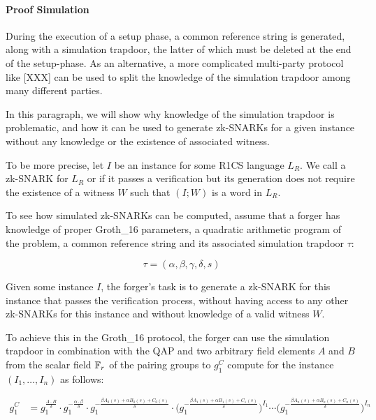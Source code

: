 \paragraph{Proof Simulation} During the execution of a setup phase, a common reference string is generated, along with a simulation trapdoor, the latter of which must be deleted at the end of the setup-phase. As an alternative, a more complicated multi-party protocol like [XXX] can be used to split the knowledge of the simulation trapdoor among many different parties.

In this paragraph, we will show why knowledge of the simulation trapdoor is problematic, and how it can be used to generate zk-SNARKs for a given instance without any knowledge or the existence of associated witness. 

To be more precise, let $I$ be an instance for some R1CS language $L_R$. We call a zk-SNARK for $L_R$  or  if it passes a verification but its generation does not require the existence of a witness $W$ such that  $(I;W)$ is a word in $L_R$. 

To see how simulated zk-SNARKs can be computed, assume that a forger has knowledge of proper Groth\_16 parameters, a quadratic arithmetic program of the problem, a common reference string and its associated simulation trapdoor $\tau $:

\begin{equation}
\tau = (\alpha,\beta,\gamma,\delta,s)
\end{equation}

Given some instance $I$, the forger's task is to generate a zk-SNARK for this instance that passes the verification process, without having access to any other zk-SNARKs for this instance and without knowledge of a valid witness $W$.

To achieve this in the Groth\_16 protocol, the forger can use the simulation trapdoor in combination with the QAP and two arbitrary field elements $A$ and $B$ from the scalar field $\mathbb{F}_r$ of the pairing groups to $g_1^C$ compute for the instance $(I_1,\ldots,I_n)$ as follows:

\begin{align*}
g_1^C & = g_1^{\frac{A\cdot B}{\delta}}\cdot g_1^{-\frac{\alpha\cdot \beta}{\delta}}\cdot g_1^{-\frac{\beta A_0(s) + \alpha B_0(s)+ C_0(s)}{\delta}}\cdot \Big(g_1^{-\frac{\beta A_1(s) + \alpha B_1(s)+ C_1(s)}{\delta}}\Big)^{I_1}\cdots \Big(g_1^{-\frac{\beta A_n(s) + \alpha B_n(s)+ C_n(s)}{\delta}}\Big)^{I_n}\
\end{align*} 


